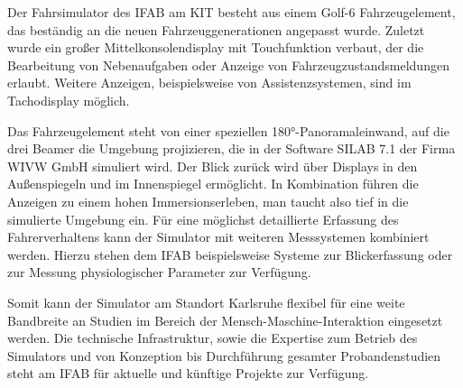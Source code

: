 \pagecolor{white} %



Der Fahrsimulator des IFAB am KIT besteht aus einem Golf-6 Fahrzeugelement, das beständig an die neuen Fahrzeuggenerationen angepasst wurde. Zuletzt wurde ein großer Mittelkonsolendisplay mit Touchfunktion verbaut, der die Bearbeitung von Nebenaufgaben oder Anzeige von Fahrzeugzustandsmeldungen erlaubt. Weitere Anzeigen, beispielsweise von Assistenzsystemen, sind im Tachodisplay möglich.

\begin{figure}\vspace{-0.5cm}
\end{figure}
Das Fahrzeugelement steht von einer speziellen 180°-Panoramaleinwand, auf die drei Beamer die Umgebung projizieren, die in der Software SILAB 7.1 der Firma WIVW GmbH simuliert wird. Der Blick zurück wird über Displays in den Außenspiegeln und im Innenspiegel ermöglicht. In Kombination führen die Anzeigen zu einem hohen Immersionserleben, man taucht also tief in die simulierte Umgebung ein.  Für eine möglichst detaillierte Erfassung des Fahrerverhaltens kann der Simulator mit weiteren Messsystemen kombiniert werden. Hierzu stehen dem IFAB beispielsweise Systeme zur Blickerfassung oder zur Messung physiologischer Parameter zur Verfügung.

Somit kann der Simulator am Standort Karlsruhe flexibel für eine weite Bandbreite an Studien im Bereich der Mensch-Maschine-Interaktion eingesetzt werden. Die technische Infrastruktur, sowie die Expertise zum Betrieb des Simulators und von Konzeption bis Durchführung gesamter Probandenstudien steht am IFAB für aktuelle und künftige Projekte zur Verfügung. 
\markEndOfContent %

